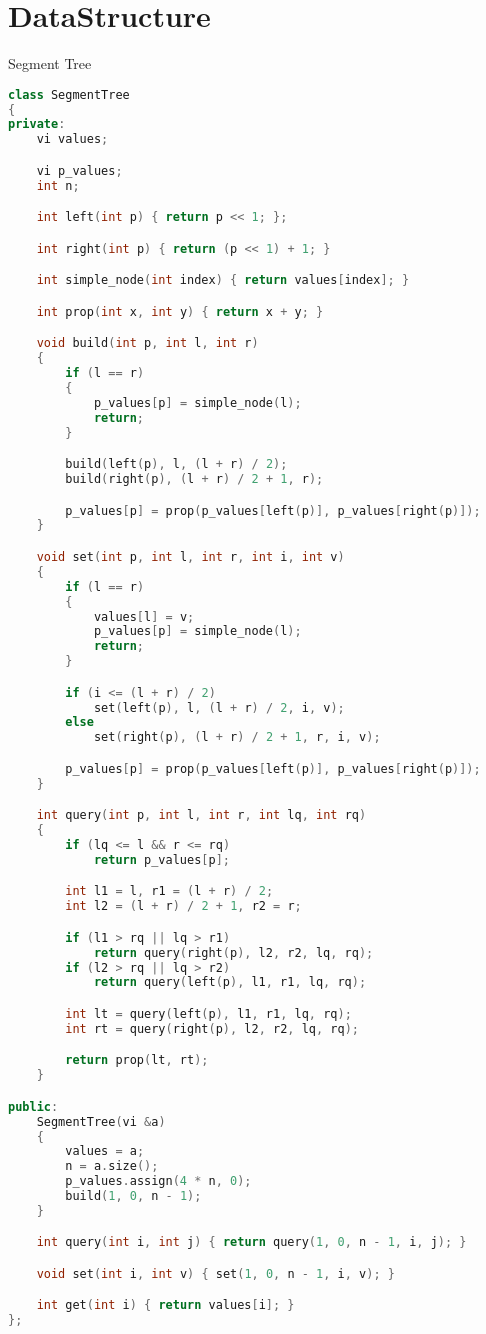 \documentclass[leter]{amsart}
\begin{document}
\section{DataStructure}
Segment Tree
\begin{multicols}{2}
\begin{lstlisting}[language=C++]
class SegmentTree
{
private:
    vi values;

    vi p_values;
    int n;

    int left(int p) { return p << 1; };

    int right(int p) { return (p << 1) + 1; }

    int simple_node(int index) { return values[index]; }

    int prop(int x, int y) { return x + y; }

    void build(int p, int l, int r)
    {
        if (l == r)
        {
            p_values[p] = simple_node(l);
            return;
        }

        build(left(p), l, (l + r) / 2);
        build(right(p), (l + r) / 2 + 1, r);

        p_values[p] = prop(p_values[left(p)], p_values[right(p)]);
    }

    void set(int p, int l, int r, int i, int v)
    {
        if (l == r)
        {
            values[l] = v;
            p_values[p] = simple_node(l);
            return;
        }

        if (i <= (l + r) / 2)
            set(left(p), l, (l + r) / 2, i, v);
        else
            set(right(p), (l + r) / 2 + 1, r, i, v);

        p_values[p] = prop(p_values[left(p)], p_values[right(p)]);
    }

    int query(int p, int l, int r, int lq, int rq)
    {
        if (lq <= l && r <= rq)
            return p_values[p];

        int l1 = l, r1 = (l + r) / 2;
        int l2 = (l + r) / 2 + 1, r2 = r;

        if (l1 > rq || lq > r1)
            return query(right(p), l2, r2, lq, rq);
        if (l2 > rq || lq > r2)
            return query(left(p), l1, r1, lq, rq);

        int lt = query(left(p), l1, r1, lq, rq);
        int rt = query(right(p), l2, r2, lq, rq);

        return prop(lt, rt);
    }

public:
    SegmentTree(vi &a)
    {
        values = a;
        n = a.size();
        p_values.assign(4 * n, 0);
        build(1, 0, n - 1);
    }

    int query(int i, int j) { return query(1, 0, n - 1, i, j); }

    void set(int i, int v) { set(1, 0, n - 1, i, v); }

    int get(int i) { return values[i]; }
};

\end{lstlisting}
\end{multicols}
\end{document}
